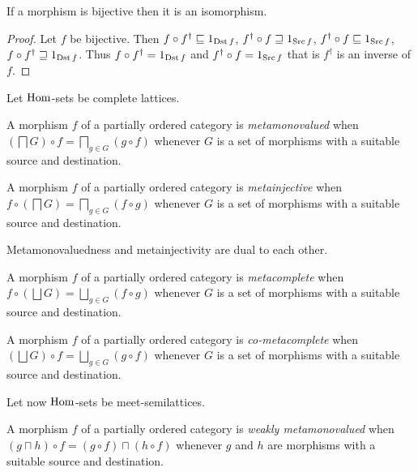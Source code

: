\begin{prop}
If a morphism is bijective then it is an isomorphism.\end{prop}
\begin{proof}
Let $f$ be bijective. Then $f\circ f^{\dagger}\sqsubseteq1_{\operatorname{Dst} f}$,
$f^{\dagger}\circ f\sqsupseteq1_{\operatorname{Src} f}$, $f^{\dagger}\circ f\sqsubseteq1_{\operatorname{Src} f}$,
$f\circ f^{\dagger}\sqsupseteq1_{\operatorname{Dst} f}$. Thus $f\circ f^{\dagger}=1_{\operatorname{Dst} f}$
and $f^{\dagger}\circ f=1_{\operatorname{Src} f}$ that is $f^{\dagger}$ is an
inverse of $f$.
\end{proof}
Let $\operatorname{Hom}$-sets be complete lattices.
\begin{defn}
A morphism $f$ of a partially ordered
category is \emph{metamonovalued} when $\left(\bigsqcap G\right)\circ f=\bigsqcap_{g\in G}(g\circ f)$
whenever $G$ is a set of morphisms with a suitable source and destination.
\end{defn}

\begin{defn}
A morphism $f$ of a partially ordered
category is \emph{metainjective} when $f\circ\left(\bigsqcap G\right)=\bigsqcap_{g\in G}(f\circ g)$
whenever $G$ is a set of morphisms with a suitable source and destination.\end{defn}
\begin{obvious}
Metamonovaluedness and metainjectivity are dual to each other.\end{obvious}
\begin{defn}
A morphism $f$ of a partially ordered
category is \emph{metacomplete} when $f\circ\left(\bigsqcup G\right)=\bigsqcup_{g\in G}(f\circ g)$
whenever $G$ is a set of morphisms with a suitable source and destination.
\end{defn}

\begin{defn}
A morphism $f$ of a partially ordered
category is \emph{co-metacomplete} when $\left(\bigsqcup G\right)\circ f=\bigsqcup_{g\in G}(g\circ f)$
whenever $G$ is a set of morphisms with a suitable source and destination.
\end{defn}
Let now $\operatorname{Hom}$-sets be meet-semilattices.
\begin{defn}
A morphism $f$ of a partially
ordered category is \emph{weakly metamonovalued} when $(g\sqcap h)\circ f=(g\circ f)\sqcap(h\circ f)$
whenever $g$ and $h$ are morphisms with a suitable source and destination.
\end{defn}

